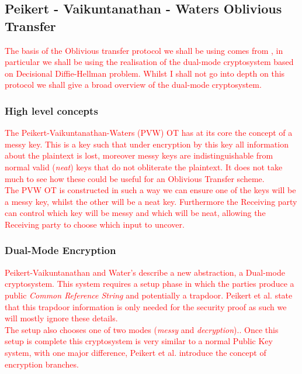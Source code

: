 \documentclass[ %
                    author={Nicholas Tutte},
                supervisor={Prof. Nigel Smart},
                    degree={MEng},
                     title={Secure Two Party Computation},
                  subtitle={A practical comparison of recent protocols},
                      type={Research - GG1K},
                      year={2015} ]{dissertation}
\begin{document}
			\subsection{Peikert - Vaikuntanathan - Waters Oblivious Transfer} \label{sub:dualModeCryptoOT}
				\textcolor{red}{The basis of the Oblivious transfer protocol we shall be using comes from \cite{PVW_OT_2008}, in particular we shall be using the realisation of the dual-mode cryptosystem based on Decisional Diffie-Hellman problem. Whilst I shall not go into depth on this protocol we shall give a broad overview of the dual-mode cryptosystem.}\\

				\subsubsection{High level concepts}
					\textcolor{red}{The Peikert-Vaikuntanathan-Waters (PVW) OT has at its core the concept of a messy key. This is a key such that under encryption by this key all information about the plaintext is lost, moreover messy keys are indistinguishable from normal valid (\emph{neat}) keys that do not obliterate the plaintext. It does not take much to see how these could be useful for an Oblivious Transfer scheme.}\\

					\textcolor{red}{The PVW OT is constructed in such a way we can ensure one of the keys will be a messy key, whilst the other will be a neat key. Furthermore the Receiving party can control which key will be messy and which will be neat, allowing the Receiving party to choose which input to uncover.}

				\subsubsection{Dual-Mode Encryption}
					\textcolor{red}{Peikert-Vaikuntanathan and Water's describe a new abstraction, a Dual-mode cryptosystem. This system requires a setup phase in which the parties produce a public \emph{Common Reference String} and potentially a trapdoor. Peikert et al. state that this trapdoor information is only needed for the security proof as such we will mostly ignore these details.}\\

					\textcolor{red}{The setup also chooses one of two modes (\emph{messy} and \emph{decryption}).. Once this setup is complete this cryptosystem is very similar to a normal Public Key system, with one major difference, Peikert et al. introduce the concept of encryption branches.}\\
					
\end{document}
